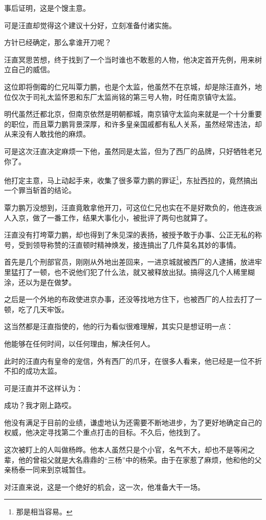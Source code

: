 \begin{multicols}{\theparacolNo}
		事后证明，这是个馊主意。

		可是汪直却觉得这个建议十分好，立刻准备付诸实施。

		方针已经确定，那么拿谁开刀呢？

		汪直冥思苦想，终于找到了一个当时谁也不敢惹的人物，他决定首开先例，用来树立自己的威信。

		这位即将倒霉的仁兄叫覃力鹏，也是个太监，他虽然不在京城，却是除汪直外，地位仅次于司礼太监怀恩和东厂太监尚铭的第三号人物，时任南京镇守太监。

		明代虽然迁都北京，但南京依然是明朝都城，南京镇守太监向来就是一个十分重要的职位，而且覃力鹏背景深厚，和许多皇亲国戚都有私人关系，虽然经常违法，却从来没有人敢找他的麻烦。

		可是这次汪直决定麻烦一下他，虽然同是太监，但为了西厂的品牌，只好牺牲老兄你了。

		他打定主意，马上动起手来，收集了很多覃力鹏的罪证\footnote{那是相当容易。}，东扯西拉的，竟然搞出一个罪当斩首的结论。

		覃力鹏万没想到，汪直竟敢拿他开刀，可这位仁兄也实在不是好欺负的，他连夜派人入京，做了一番工作，结果大事化小，被批评了两句也就算了。

		汪直没有打垮覃力鹏，却也得到了朱见深的表扬，被授予敢于办事、公正无私的称号，受到领导称赞的汪直顿时精神焕发，接连搞出了几件莫名其妙的事情。

		首先是几个刑部官员，刚刚从外地出差回来，一进京城就被西厂的人逮捕，放进牢里猛打了一顿，也不说他们犯了什么法，就又被释放出狱。搞得这几个人稀里糊涂，还以为是在做梦。

		之后是一个外地的布政使进京办事，还没等找地方住下，也被西厂的人拉去打了一顿，吃了几天牢饭。

		这当然都是汪直指使的，他的行为看似很难理解，其实只是想证明一点：

		他能够在任何时间，以任何理由，解决任何人。

		此时的汪直内有皇帝的宠信，外有西厂的爪牙，在很多人看来，他已经是一位不折不扣的成功太监。

		可是汪直并不这样认为：

		成功？我才刚上路哎。

		他没有满足于目前的业绩，谦虚地认为还需要不断地进步，为了更好地确定自己的权威，他决定寻找第二个重点打击的目标。不久后，他找到了。

		这次被盯上的人叫做杨晔。他本人虽然只是个小官，名气不大，却也不是等闲之辈，他的曾祖父就是大名鼎鼎的“三杨”中的杨荣。由于在家惹了麻烦，他和他的父亲杨泰一同来到京城暂住。

		对汪直来说，这是一个绝好的机会，这一次，他准备大干一场。


\end{multicols}

